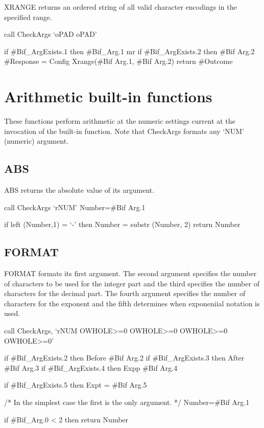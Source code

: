 XRANGE returns an ordered string of all valid character encodings in the
specified range.

call CheckArgs `oPAD oPAD'

if \#Bif\_ArgExists.1 then \#Bif\_Arg.1 mr if \#Bif\_ArgExists.2 then
\#Bif Arg.2 \#Response = Config Xrange(\#Bif Arg.1, \#Bif Arg.2) return
\#Outcome

\section{Arithmetic built-in
functions}\label{arithmetic-built-in-functions}

These functions perform arithmetic at the numeric settings current at
the invocation of the built-in function. Note that CheckArgs formats any
`NUM' (numeric) argument.

\subsection{ABS}\label{abs}

ABS returns the absolute value of its argument.

call CheckArgs `rNUM' Number=\#Bif Arg.1

if left (Number,1) = `-' then Number = substr (Number, 2) return Number

\subsection{FORMAT}\label{format}

FORMAT formats its first argument. The second argument specifies the
number of characters to be used for the integer part and the third
specifies the number of characters for the decimal part. The fourth
argument specifies the number of characters for the exponent and the
fifth determines when exponeniial notation is used.

call CheckArgs, `rNUM OWHOLE\textgreater=0 OWHOLE\textgreater=0
OWHOLE\textgreater=0 OWHOLE\textgreater=0'

if \#Bif\_ArgExists.2 then Before \#Bif Arg.2 if \#Bif\_ArgExists.3 then
After \#Bif Arg.3 if \#Bif\_ArgExists.4 then Expp \#Bif Arg.4

if \#Bif\_ArgExists.5 then Expt = \#Bif Arg.5

/* In the simplest case the first is the only argument. */ Number=\#Bif
Arg.1

if \#Bif\_Arg.0 \textless{} 2 then return Number

